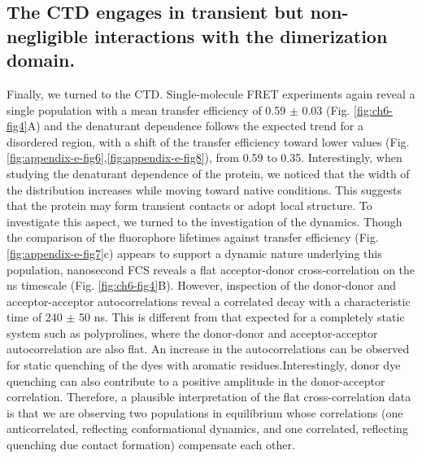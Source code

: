 \documentclass[../main.tex]{subfiles}
\begin{document}
    \subsection{The CTD engages in transient but non-negligible interactions with the dimerization domain.}
        Finally, we turned to the CTD. Single-molecule FRET experiments again reveal a single population with a mean transfer efficiency of 0.59 $\pm$ 0.03 (Fig. \ref{fig:ch6-fig4}A) and the denaturant dependence follows the expected trend for a disordered region, with a shift of the transfer efficiency toward lower values (Fig. \ref{fig:appendix-e-fig6},\ref{fig:appendix-e-fig8}), from 0.59 to 0.35. Interestingly, when studying the denaturant dependence of the protein, we noticed that the width of the distribution increases while moving toward native conditions. This suggests that the protein may form transient contacts or adopt local structure. To investigate this aspect, we turned to the investigation of the dynamics. Though the comparison of the fluorophore lifetimes against transfer efficiency (Fig. \ref{fig:appendix-e-fig7}c) appears to support a dynamic nature underlying this population, nanosecond FCS reveals a flat acceptor-donor cross-correlation on the ns timescale (Fig. \ref{fig:ch6-fig4}B). However, inspection of the donor-donor and acceptor-acceptor autocorrelations reveal a correlated decay with a characteristic time of 240 $\pm$ 50 ns. This is different from that expected for a completely static system such as polyprolines\cite{Nettels2007-lf}, where the donor-donor and acceptor-acceptor autocorrelation are also flat. An increase in the autocorrelations can be observed for static quenching of the dyes with aromatic residues.Interestingly, donor dye quenching can also contribute to a positive amplitude in the donor-acceptor correlation\cite{Sauer2014-ux,Haenni2013-xz}. Therefore, a plausible interpretation of the flat cross-correlation data is that we are observing two populations in equilibrium whose correlations (one anticorrelated, reflecting conformational dynamics, and one correlated, reflecting quenching due contact formation) compensate each other. 
\end{document}
